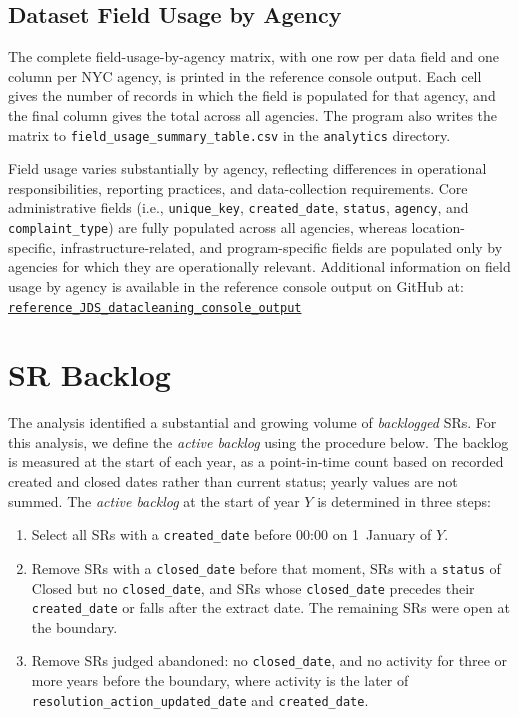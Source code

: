 \documentclass[linenumber]{jdsart}
\begin{document}

\subsection{Dataset Field Usage by Agency}


The complete field-usage-by-agency matrix, with one row per data field and
one column per NYC agency, is printed in the reference console output. Each
cell gives the number of records in which the field is populated for that
agency, and the final column gives the total across all agencies. The
program also writes the matrix to \texttt{field\_usage\_summary\_table.csv}
in the \texttt{analytics} directory.


Field usage varies substantially by agency, reflecting differences in
operational responsibilities, reporting practices, and data-collection
requirements. Core administrative fields (i.e., \texttt{unique\_key},
\texttt{created\_date}, \texttt{status}, \texttt{agency}, and 
\texttt{complaint\_type}) are fully populated across all 
agencies, whereas location-specific, infrastructure-related, 
and program-specific fields are populated only by agencies for 
which they are operationally relevant. Additional information on field
usage by agency is available in the reference console output on GitHub at:\\
\href{https://github.com/tusseyd/nyc_311_data_cleaning/blob/main/reference_console_output/reference_JDS_datacleaning_console_output.txt}{\texttt{reference\_JDS\_datacleaning\_console\_output}}


\section{SR Backlog}

The analysis identified a substantial and growing volume of
\emph{backlogged} SRs. For this analysis, we define the \emph{active backlog}
using the procedure below. The backlog is measured at the start of each year,
as a point-in-time count based on recorded created and closed dates rather
than current status; yearly values are not summed. The \emph{active
backlog} at the start of year $Y$ is determined in three steps:

\begin{enumerate}
  \item Select all SRs with a \texttt{created\_date} before 00:00 on
  1~January of $Y$.
  \item Remove SRs with a \texttt{closed\_date} before that moment, SRs
  with a \texttt{status} of Closed but no \texttt{closed\_date}, and SRs
  whose \texttt{closed\_date} precedes their \texttt{created\_date} or
  falls after the extract date. The remaining SRs were open at the
  boundary.
  \item Remove SRs judged abandoned: no \texttt{closed\_date}, and no
  activity for three or more years before the boundary, where activity is
  the later of \texttt{resolution\_action\_updated\_date} and \texttt{created\_date}.
\end{enumerate}
\end{document}
